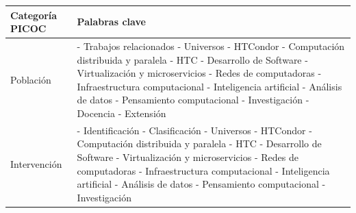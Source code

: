 \begin{table}[H]
	\centering
	\renewcommand{\arraystretch}{1.4}
	\fontsize{8}{8}\selectfont
	\begin{tabular}{|p{3cm}|p{10.0cm}|}
		\hline
		\textbf{Categoría \hbox{PICOC}} & \textbf{Palabras clave} \\
		\hline
		Población                       &
		- Trabajos relacionados \newline
		- Universos \newline
		- HTCondor \newline
		- Computación distribuida y paralela \newline
		- HTC \newline
		- Desarrollo de Software \newline
		- Virtualización y microservicios \newline
		- Redes de computadoras \newline
		- Infraestructura computacional \newline
		- Inteligencia artificial \newline
		- Análisis de datos \newline
		- Pensamiento computacional \newline
		- Investigación \newline
		- Docencia \newline
		- Extensión                                               \\
		\hline
		Intervención                    &
		- Identificación \newline
		- Clasificación \newline
		- Universos \newline
		- HTCondor \newline
		- Computación distribuida y paralela \newline
		- HTC \newline
		- Desarrollo de Software \newline
		- Virtualización y microservicios \newline
		- Redes de computadoras \newline
		- Infraestructura computacional \newline
		- Inteligencia artificial \newline
		- Análisis de datos \newline
		- Pensamiento computacional \newline
		- Investigación \newline

\end{tabular}
\end{table}
